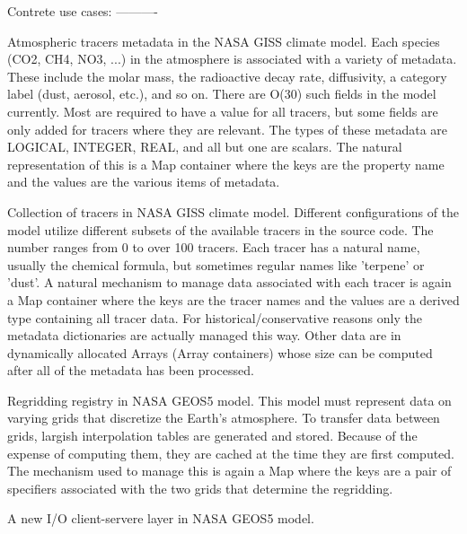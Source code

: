 \documentclass{article}
\begin{document}
Contrete use cases:
----------

Atmospheric tracers metadata in the NASA GISS climate model.  Each species (CO2, CH4, NO3, ...) in the atmosphere is associated with a variety of metadata.  These include the molar mass, the radioactive decay rate, diffusivity, a category label (dust, aerosol, etc.),   and so on.  There are O(30) such fields in the model currently.   Most are required to have a value for all tracers, but some fields   are only added for tracers where they are relevant.  The types of   these metadata are LOGICAL, INTEGER, REAL, and all but one are   scalars.  The natural representation of this is a Map container
   where the keys are the property name and the values are the various   items of metadata.

Collection of tracers in NASA GISS climate model.  Different   configurations of the model utilize different subsets of the   available tracers in the source code.  The number ranges from 0 to   over 100 tracers.  Each tracer has a natural name, usually the   chemical formula, but sometimes regular names like 'terpene' or   'dust'.  A natural mechanism to manage data associated with each
   tracer is again a Map container where the keys are the tracer names   and the values are a derived type containing all tracer data.  For   historical/conservative reasons only the metadata dictionaries are   actually managed this way.  Other data are in dynamically allocated
   Arrays (Array containers) whose size can be computed after all of   the metadata has been processed.

Regridding registry in NASA GEOS5 model.  This model must represent   data on varying grids that discretize the Earth's atmosphere.  To   transfer data between grids, largish interpolation tables are
   generated and stored.  Because of the expense of computing them,   they are cached at the time they are first computed.  The mechanism   used to manage this is again a Map where the keys are a pair of
   specifiers associated with the two grids that determine the   regridding.


A new I/O client-servere layer in NASA GEOS5 model.   
\end{document}
